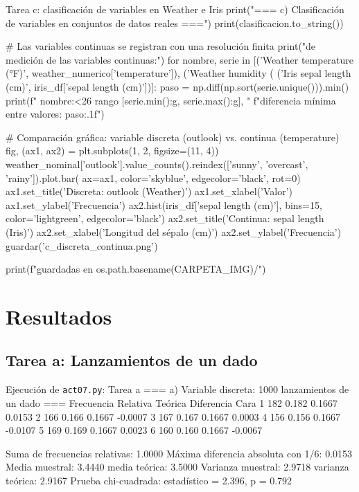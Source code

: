 \documentclass[11pt,letterpaper]{article}
\begin{document}
\begin{codigo}[label=cod:c]{Tarea c: clasificación de variables en Weather e Iris}
print("\n=== c) Clasificación de variables en conjuntos de datos reales ===")
print(clasificacion.to_string())

# Las variables continuas se registran con una resolución finita
print(" de medición de las variables continuas:")
for nombre, serie in [('Weather temperature (°F)', weather_numerico['temperature']),
                      ('Weather humidity (%
                      ('Iris sepal length (cm)', iris_df['sepal length (cm)'])]:
    paso = np.diff(np.sort(serie.unique())).min()
    print(f"  {nombre:<26} rango [{serie.min():g}, {serie.max():g}], "
          f"diferencia mínima entre valores: {paso:.1f}")

# Comparación gráfica: variable discreta (outlook) vs. continua (temperature)
fig, (ax1, ax2) = plt.subplots(1, 2, figsize=(11, 4))
weather_nominal['outlook'].value_counts().reindex(['sunny', 'overcast', 'rainy']).plot.bar(
    ax=ax1, color='skyblue', edgecolor='black', rot=0)
ax1.set_title('Discreta: outlook (Weather)')
ax1.set_xlabel('Valor')
ax1.set_ylabel('Frecuencia')
ax2.hist(iris_df['sepal length (cm)'], bins=15, color='lightgreen', edgecolor='black')
ax2.set_title('Continua: sepal length (Iris)')
ax2.set_xlabel('Longitud del sépalo (cm)')
ax2.set_ylabel('Frecuencia')
guardar('c_discreta_continua.png')

print(f"\nFiguras guardadas en {os.path.basename(CARPETA_IMG)}/")
\end{codigo}

\section{Resultados}

\subsection{Tarea a: Lanzamientos de un dado}

\begin{consola}[label=out:a]{Ejecución de \texttt{act07.py}: Tarea a}
=== a) Variable discreta: 1000 lanzamientos de un dado ===
      Frecuencia  Relativa  Teórica  Diferencia
Cara
1            182     0.182   0.1667      0.0153
2            166     0.166   0.1667     -0.0007
3            167     0.167   0.1667      0.0003
4            156     0.156   0.1667     -0.0107
5            169     0.169   0.1667      0.0023
6            160     0.160   0.1667     -0.0067

Suma de frecuencias relativas: 1.0000
Máxima diferencia absoluta con 1/6: 0.0153
Media muestral: 3.4440   media teórica: 3.5000
Varianza muestral: 2.9718   varianza teórica: 2.9167
Prueba chi-cuadrada: estadístico = 2.396, p = 0.792
\end{consola}
\end{document}
